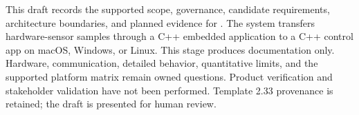 This draft records the supported scope, governance, candidate requirements, architecture boundaries, and planned evidence for \ProjectName. The system transfers hardware-sensor samples through a C++ embedded application to a C++ control app on macOS, Windows, or Linux. This stage produces documentation only. Hardware, communication, detailed behavior, quantitative limits, and the supported platform matrix remain owned questions. Product verification and stakeholder validation have not been performed. Template 2.33 provenance is retained; the draft is presented for human review.
